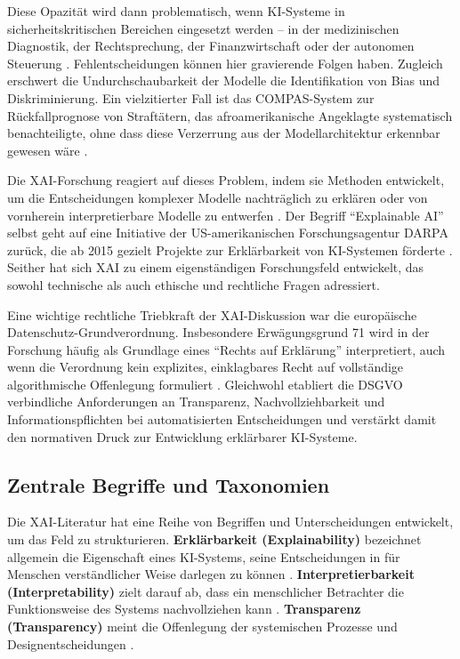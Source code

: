 \documentclass[
  12pt,
  a4paper,
  oneside,
  titlepage
]{article}
\begin{document}
Diese Opazität wird dann problematisch, wenn KI-Systeme in sicherheitskritischen 
Bereichen eingesetzt werden – in der medizinischen Diagnostik, der Rechtsprechung, 
der Finanzwirtschaft oder der autonomen Steuerung \citep[ S.~80800]{Ortigossa2024}. 
Fehlentscheidungen können hier gravierende Folgen haben. Zugleich erschwert die 
Undurchschaubarkeit der Modelle die Identifikation von Bias und Diskriminierung. 
Ein vielzitierter Fall ist das COMPAS-System zur Rückfallprognose von Straftätern, 
das afroamerikanische Angeklagte systematisch benachteiligte, ohne dass diese 
Verzerrung aus der Modellarchitektur erkennbar gewesen wäre \citep[ S.~84]{BarredoArrieta2020}.

Die XAI-Forschung reagiert auf dieses Problem, indem sie Methoden entwickelt, um 
die Entscheidungen komplexer Modelle nachträglich zu erklären oder von vornherein 
interpretierbare Modelle zu entwerfen \citep{Mersha2024}. Der Begriff \enquote{Explainable AI} 
selbst geht auf eine Initiative der US-amerikanischen Forschungsagentur DARPA zurück, 
die ab 2015 gezielt Projekte zur Erklärbarkeit von KI-Systemen förderte 
\citep[ S.~86]{BarredoArrieta2020}. Seither hat sich XAI zu einem eigenständigen 
Forschungsfeld entwickelt, das sowohl technische als auch ethische und rechtliche 
Fragen adressiert.

Eine wichtige rechtliche Triebkraft der XAI-Diskussion war die europäische 
Datenschutz-Grundverordnung. Insbesondere Erwägungsgrund 71 wird in der Forschung 
häufig als Grundlage eines \enquote{Rechts auf Erklärung} interpretiert, auch wenn 
die Verordnung kein explizites, einklagbares Recht auf vollständige algorithmische 
Offenlegung formuliert \citep{Wachter2017}. Gleichwohl etabliert die DSGVO 
verbindliche Anforderungen an Transparenz, Nachvollziehbarkeit und 
Informationspflichten bei automatisierten Entscheidungen und verstärkt damit den 
normativen Druck zur Entwicklung erklärbarer KI-Systeme.

\subsection{Zentrale Begriffe und Taxonomien}

Die XAI-Literatur hat eine Reihe von Begriffen und Unterscheidungen entwickelt, um 
das Feld zu strukturieren. \textbf{Erklärbarkeit (Explainability)} bezeichnet 
allgemein die Eigenschaft eines KI-Systems, seine Entscheidungen in für Menschen 
verständlicher Weise darlegen zu können \citep[ S.~89]{BarredoArrieta2020}. 
\textbf{Interpretierbarkeit (Interpretability)} zielt darauf ab, dass ein 
menschlicher Betrachter die Funktionsweise des Systems nachvollziehen kann 
\citep[ S.~25]{Weller2019}. \textbf{Transparenz (Transparency)} meint die 
Offenlegung der systemischen Prozesse und Designentscheidungen \citep[ S.~27]{Weller2019}.
\end{document}
